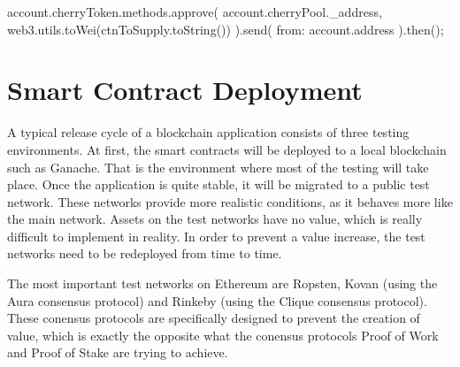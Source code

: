 \begin{JsCode}
account.cherryToken.methods.approve(
  account.cherryPool._address,
  web3.utils.toWei(ctnToSupply.toString())
).send({ from: account.address }).then();	
\end{JsCode}


\section{Smart Contract Deployment}
\label{sec:deployment}

A typical release cycle of a blockchain application consists of three testing environments. At first, the smart contracts will be deployed to a local blockchain such as Ganache\cite{Ganache}. That is the environment where most of the testing will take place. Once the application is quite stable, it will be migrated to a public test network. These networks provide more realistic conditions, as it behaves more like the main network. Assets on the test networks have no value, which is really difficult to implement in reality. In order to prevent a value increase, the test networks need to be redeployed from time to time.

The most important test networks on Ethereum are Ropsten, Kovan (using the Aura consensus protocol) and Rinkeby (using the Clique consensus protocol). These conensus protocols are specifically designed to prevent the creation of value, which is exactly the opposite what the conensus protocols Proof of Work and Proof of Stake are trying to achieve.